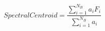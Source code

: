\begin{displaymath}
\mathit{SpectralCentroid} = \frac{\sum_{i=1}^{N_B} a_i F_i}{\sum_{i=1}^{N_B} a_i} 
\label{eq:spectral_centroid}
\end{displaymath}
